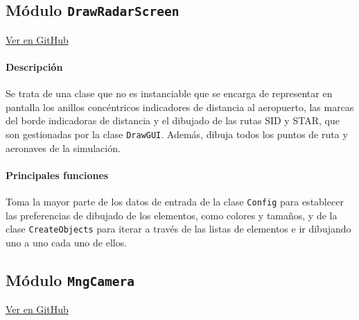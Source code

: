 \subsection{Módulo \texttt{DrawRadarScreen}}
\label{subsec:ClaseDrawRadarScreen}

\vspace{-0.85cm}
\begin{flushright}
\href{https://github.com/macgyver912/atc-simulator/blob/jaime/Assets/Scripts/graphics/DrawRadarScreen.cs}{Ver en GitHub \faGithub}
\end{flushright}

\paragraph{Descripción} \phantom{\newline}

Se trata de una clase que no es instanciable que se encarga de representar en pantalla los anillos concéntricos indicadores de distancia al aeropuerto, las marcas del borde indicadoras de distancia y el dibujado de las rutas SID y STAR, que son gestionadas por la clase \texttt{DrawGUI}. Además, dibuja todos los puntos de ruta y aeronaves de la simulación.

\paragraph{Principales funciones} \phantom{\newline}

Toma la mayor parte de los datos de entrada de la clase \texttt{Config} para establecer las preferencias de dibujado de los elementos, como colores y tamaños, y de la clase \texttt{CreateObjects} para iterar a través de las listas de elementos e ir dibujando uno a uno cada uno de ellos.



\clearpage

\subsection{Módulo \texttt{MngCamera}}
\label{subsec:ClaseMngCamera}

\vspace{-0.85cm}
\begin{flushright}
\href{https://github.com/macgyver912/atc-simulator/blob/jaime/Assets/Scripts/graphics/MngCamera.cs}{Ver en GitHub \faGithub}
\end{flushright}


